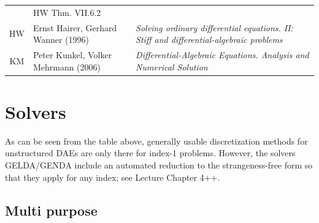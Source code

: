 \documentclass[]{book}
\theoremstyle{definition}
\theoremstyle{definition}
\theoremstyle{definition}
\theoremstyle{remark}
\begin{document}
\begin{longtable}[]{@{}cll@{}}
\begin{minipage}[t]{0.39\columnwidth}
\end{minipage} & \begin{minipage}[t]{0.37\columnwidth}\raggedright\strut
HW Thm. VII.6.2\strut
\end{minipage}\tabularnewline
\begin{minipage}[t]{0.05\columnwidth}\centering\strut
HW\strut
\end{minipage} & \begin{minipage}[t]{0.39\columnwidth}\raggedright\strut
Ernst Hairer, Gerhard Wanner (1996)\strut
\end{minipage} & \begin{minipage}[t]{0.37\columnwidth}\raggedright\strut
\emph{Solving ordinary differential equations. II: Stiff and
differential-algebraic problems}\strut
\end{minipage}\tabularnewline
\begin{minipage}[t]{0.05\columnwidth}\centering\strut
KM\strut
\end{minipage} & \begin{minipage}[t]{0.39\columnwidth}\raggedright\strut
Peter Kunkel, Volker Mehrmann (2006)\strut
\end{minipage} & \begin{minipage}[t]{0.37\columnwidth}\raggedright\strut
\emph{Differential-Algebraic Equations. Analysis and Numerical
Solution}\strut
\end{minipage}\tabularnewline
\bottomrule
\end{longtable}

\section{Solvers}\label{solvers}

As can be seen from the table above, generally usable discretization
methods for unstructured DAEs are only there for index-1 problems.
However, the solvers GELDA/GENDA include an automated reduction to the
strangeness-free form so that they apply for any index; see Lecture
Chapter 4++.

\subsection{Multi purpose}\label{multi-purpose}
\end{document}
